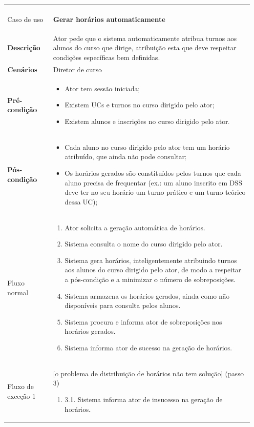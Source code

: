 \documentclass[12pt, a4paper]{article}
\newenvironment{condition}{
    \begin{itemize}[wide=0pt]
        \vspace{-0.2cm}
}{
        \vspace{-0.5cm}
    \end{itemize}
}
\newcommand\flow[1]{
    Fluxo normal &
    \vspace{-0.9cm}
    \singlespacing
    \begin{enumerate}[wide=0pt]
        #1
        \vspace{-0.3cm}
    \end{enumerate} \\ \hline
}
\newcommand\otherflow[3]{
    #1 &
    #2
    \singlespacing
    \begin{enumerate}[wide=0pt]
        #3
        \vspace{-0.3cm}
    \end{enumerate} \\ \hline
}
\newenvironment{usecase}[5]{
    \begin{longtable}{|>{\centering\arraybackslash\bf}m{3cm}|m{13cm}|}
        \multicolumn{2}{c}{\ldots Continua \ldots} \\
        \endfoot
        \endlastfoot

        \hline
        Caso de uso & \textbf{#1} \\

        \hline
        Descrição & #2 \\

        \hline
        Cenários & #3 \\

        \hline
        Pré-condição &
        \vspace{-0.8cm}
        \begin{condition}
            #4
        \end{condition} \\

        \hline
        Pós-condição &
        \vspace{-0.8cm}
        \begin{condition}
            #5
        \end{condition} \\

        \hline
}{
\end{longtable}
}
\begin{document}
\begin{usecase}
    {Gerar horários automaticamente}
    {
        Ator pede que o sistema automaticamente atribua turnos aos alunos do curso que dirige,
        atribuição esta que deve respeitar condições específicas bem definidas.
    }
    {Diretor de curso}
    {
        \item Ator tem sessão iniciada;
        \item Existem UCs e turnos no curso dirigido pelo ator;
        \item Existem alunos e inscrições no curso dirigido pelo ator.
    }
    {
        \item Cada aluno no curso dirigido pelo ator tem um horário atribuído, que ainda não pode
            consultar;
        \item Os horários gerados são constituídos pelos turnos que cada aluno precisa de frequentar
            (ex.: um aluno inscrito em DSS deve ter no seu horário um turno prático e um turno
             teórico dessa UC);
    }

    \flow{
        \item Ator solicita a geração automática de horários.
        \item Sistema consulta o nome do curso dirigido pelo ator.
        \item Sistema gera horários, inteligentemente atribuindo turnos aos alunos do curso
            dirigido pelo ator, de modo a respeitar a pós-condição e a minimizar o número de
            sobreposições.
        \item Sistema armazena os horários gerados, ainda como não disponíveis para consulta pelos
            alunos.
        \item Sistema procura e informa ator de sobreposições nos horários gerados.
        \item Sistema informa ator de sucesso na geração de horários.
    }

    \otherflow{Fluxo de exceção 1}
        {[o problema de distribuição de horários não tem solução] (passo 3)}{

        \item[3.1.] Sistema informa ator de insucesso na geração de horários.
    }
\end{usecase}
\end{document}
